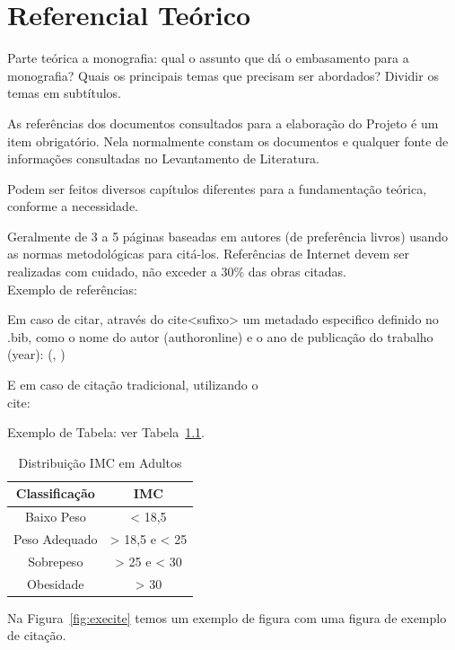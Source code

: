 \documentclass[
	12pt,				    %
	openright,			    %
	oneside,			    %
	a4paper,			    %
    sumario=tradicional,        %
	english,			    %
	brazil,				    %
 ]{abntex2}
\begin{document}
\chapter{Referencial Teórico}\label{sec:RefTeorico}

Parte teórica a monografia: qual o assunto que dá o embasamento para a monografia? Quais os principais temas que precisam ser abordados? Dividir os temas em subtítulos.

As referências dos documentos consultados para a elaboração do Projeto é um item obrigatório. Nela normalmente constam os documentos e qualquer fonte de informações consultadas no Levantamento de Literatura.

Podem ser feitos diversos capítulos diferentes para a fundamentação teórica, conforme a necessidade.

Geralmente de 3 a 5 páginas baseadas em autores (de preferência livros) usando as normas metodológicas para citá-los. Referências de Internet devem ser realizadas com cuidado, não exceder a 30\% das obras citadas. \\

Exemplo de referências:

Em caso de citar, através do  cite<sufixo> um metadado especifico definido no .bib, como o nome do autor (authoronline) e o ano de publicação do trabalho (year):
(, \citeyear{NBR14724:2011})

E em caso de citação tradicional, utilizando o \\cite:
\cite{NBR14724:2011}

Exemplo de Tabela: ver Tabela~\ref{tab:exetab}.

\begin{table}[!ht]
\begin{center}
\caption{Distribuição IMC em Adultos}
\label{tab:exetab}
\begin{tabular}{|c |c |}
\hline
\textbf{\textbf{Classificação}} & \textbf{IMC}\\
\hline\hline
Baixo Peso & < 18,5 \\
Peso Adequado & > 18,5 e < 25 \\
Sobrepeso & > 25 e < 30 \\
Obesidade & > 30 \\
\hline
\end{tabular}
\end{center}
\end{table}

Na Figura~\ref{fig:execite} temos um exemplo de figura com uma figura de exemplo de citação.
\end{document}
